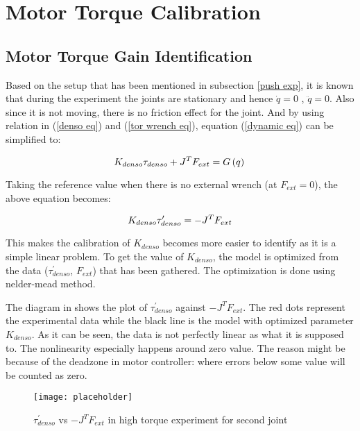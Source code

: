 \section{Motor Torque Calibration}
\subsection{Motor Torque Gain Identification}
Based on the setup that has been mentioned in subsection \ref{push exp}, it is known that during the experiment the joints are stationary and hence $\dot{q} = 0$ , $\ddot{q} = 0$. Also since it is not moving, there is no friction effect for the joint. And by using relation in (\ref{denso eq}) and (\ref{tor wrench eq}), equation (\ref{dynamic eq}) can be simplified to: 

\begin{equation}
  K_{denso} \tau_{denso} + J^{T} F_{ext}  = G\left(q \right) \\
\end{equation}

Taking the reference value when there is no external wrench (at $F_{ext} = 0$), the above equation becomes:

\begin{equation}
  K_{denso} \tau_{denso}^{\prime} = - J^{T} F_{ext} \\
\end{equation}

This makes the calibration of $K_{denso}$ becomes more easier to identify as it is a simple linear problem. To get the value of $K_{denso}$, the model is optimized from the data ($\tau_{denso}^{\prime}$, $F_{ext}$) that has been gathered. The optimization is done using nelder-mead method. 

The diagram in  shows the plot of $\tau_{denso}^{\prime}$ against $- J^{T} F_{ext}$. The red dots represent the experimental data while the black line is the model with optimized parameter $K_{denso}$. As it can be seen, the data is not perfectly linear as what it is supposed to. The nonlinearity especially happens around zero value. The reason might be because of the deadzone in motor controller: where errors below some value will be counted as zero. 

\begin{figure}[h]
    \centering
    \texttt{[image: placeholder]}
    \caption{$\tau_{denso}^{\prime}$ vs $- J^{T} F_{ext}$ in high torque experiment for second joint}
    \label{fig: tor calibration}
\end{figure}

